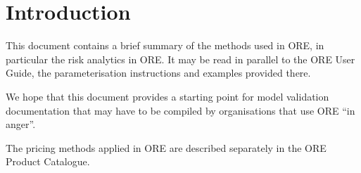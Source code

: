 \chapter{Introduction}

This document contains a brief summary of the methods used in ORE, in particular the risk analytics in ORE.
It may be read in parallel to the ORE User Guide, the parameterisation instructions and examples provided there.

We hope that this document provides a starting point for model validation documentation that may have to be
compiled by organisations that use ORE ``in anger''.

The pricing methods applied in ORE are described separately in the ORE Product Catalogue.
